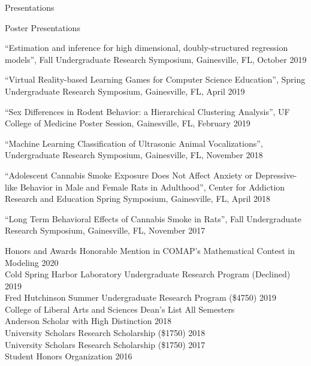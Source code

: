 \documentclass{resume}
\begin{document}
\begin{rSection}{Presentations}
  \begin{rSubsection}{Poster Presentations}{}{}{} %
    \item ``Estimation and inference for high dimensional,
      doubly-structured regression models'', Fall Undergraduate
      Research Symposium, Gainesville, FL, October 2019
      \item ``Virtual Reality-based Learning Games for Computer Science Education'', Spring Undergraduate Research Symposium, Gainesville, FL, April 2019 
      \item ``Sex Differences in Rodent Behavior: a Hierarchical Clustering Analysis'', UF College of Medicine Poster Session, Gainesville, FL, February 2019
      \item ``Machine Learning Classification of Ultrasonic Animal Vocalizations'', Undergraduate Research Symposium, Gainesville, FL, November 2018
      \item ``Adolescent Cannabis Smoke Exposure Does Not Affect
        Anxiety or Depressive-like Behavior in Male and Female Rats in
        Adulthood'', Center for Addiction Research and Education Spring Symposium, Gainesville, FL, April 2018
      \item``Long Term Behavioral Effects of Cannabis Smoke in Rats'',
        Fall Undergraduate Research Symposium, Gainesville, FL, November 2017
  \end{rSubsection}
  \end{rSection}

  \begin{rSection}{Honors and Awards}
  Honorable Mention in COMAP's Mathematical
  Contest in Modeling \hfill 2020 \\
Cold Spring Harbor Laboratory Undergraduate Research Program (Declined) \hfill 2019 \\
Fred Hutchinson Summer Undergraduate Research Program (\$4750) \hfill 2019 \\
College of Liberal Arts and Sciences Dean's List \hfill All Semesters \\
  Anderson Scholar with High Distinction \hfill 2018 \\
  University Scholars Research Scholarship (\$1750) \hfill 2018 \\
  University Scholars Research Scholarship (\$1750) \hfill 2017 \\
Student Honors Organization \hfill 2016 
 \end{rSection}
\end{document}
